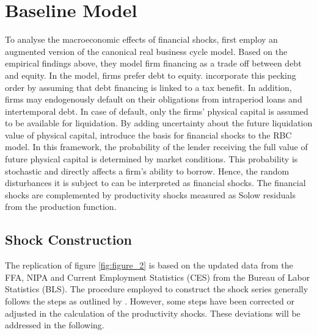 \section{Baseline Model}
\label{sec:baseline_model}

To analyse the macroeconomic effects of financial shocks, \citeauthor{JERMANNfinancial} first employ an augmented version of the canonical real business cycle model. Based on the empirical findings above, they model firm financing as a trade off between debt and equity. In the model, firms prefer debt to equity. \citeauthor{JERMANNfinancial} incorporate this pecking order by assuming that debt financing is linked to a tax benefit. In addition, firms may endogenously default on their obligations from intraperiod loans and intertemporal debt. In case of default, only the firms' physical capital is assumed to be available for liquidation. By adding uncertainty about the future liquidation value of physical capital, \citeauthor{JERMANNfinancial} introduce the basis for financial shocks to the RBC model. In this framework, the probability of the lender receiving the full value of future physical capital is determined by market conditions. This probability is stochastic and directly affects a firm's ability to borrow. Hence, the random disturbances it is subject to can be interpreted as financial shocks. The financial shocks are complemented by productivity shocks measured as Solow residuals from the production function.


\subsection{Shock Construction}
\label{sec:shock_construction}



The replication of figure \ref{fig:figure_2} is based on the updated data from the FFA, NIPA and Current Employment Statistics (CES) from the Bureau of Labor Statistics (BLS). The procedure employed to construct the shock series generally follows the steps as outlined by \citeauthor{JERMANNfinancial}. However, some steps have been corrected or adjusted in the calculation of the productivity shocks. These deviations will be addressed in the following. 

